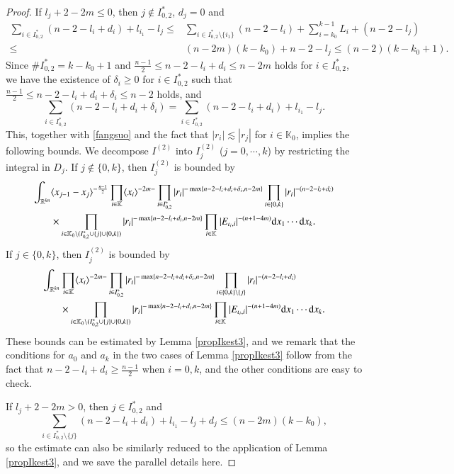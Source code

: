 \documentclass[11pt,reqno]{amsart}
\def\d{{\rm d}}
\numberwithin{equation}{section}
\theoremstyle{definition}
\begin{document}
\begin{proof}
	If $l_j+2-2m\leq0$, then $j\notin I_{0,2}^*$, $d_j=0$ and
	\begin{equation*}
		\begin{split}
			\sum_{i\in I_{0,2}^*}(n-2-l_i+d_i)+l_{i_1}-l_j\leq&\sum_{i\in I_{0,2}^*\setminus\{i_1\}}(n-2-l_i)+\sum_{i=k_0}^{k-1}L_i+(n-2-l_j)\\
			\leq&(n-2m)(k-k_0)+n-2-l_j\leq(n-2)(k-k_0+1).
		\end{split}
	\end{equation*}
	Since $\# I_{0,2}^*=k-k_0+1$ and $\frac{n-1}{2}\leq n-2-l_i+d_i\leq n-2m$ holds for $i\in I_{0,2}^*$, we have the existence of $\delta_i\geq0$ for $i\in I_{0,2}^*$ such that $\frac{n-1}{2}\leq n-2-l_i+d_i+\delta_i\leq n-2$ holds, and
	\begin{equation*}
		\sum_{i\in I_{0,2}^*}(n-2-l_i+d_i+\delta_i)=\sum_{i\in I_{0,2}^*}(n-2-l_i+d_i)+l_{i_1}-l_j.
	\end{equation*}
	This, together with \eqref{fangsuo} and the fact that $|r_i|\lesssim|r_j|$ for $i\in\mathbb{K}_0$, implies the following bounds. We decompose $I^{(2)}$ into $I^{(2)}_j$ ($j=0,\cdots,k$) by restricting the integral in $D_j$. If $j\notin\{0,k\}$, then $I^{(2)}_j$ is bounded by
	\begin{equation*}
		\begin{split}
			\int_{\mathbb{R}^{kn}}&\langle x_{j-1}-x_j\rangle^{-\frac{n-1}{2}}\prod_{i\in\mathbb{K}}\langle x_i\rangle^{-2m-}\prod_{i\in I_{0,2}^*}|r_i|^{-\max\{n-2-l_i+d_i+\delta_i,n-2m\}}\prod_{i\in\{0,k\}}|r_i|^{-(n-2-l_i+d_i)}\\
			&\times\prod_{i\in\mathbb{K}_0\setminus(I_{0,2}^*\cup\{j\}\cup\{0,k\})}|r_i|^{-\max\{n-2-l_i+d_i,n-2m\}}\prod_{i\in\mathbb{K}}|E_{\iota_i,i}|^{-(n+1-4m)}\d x_1\cdots\d x_k.
		\end{split}
	\end{equation*}
	If $j\in\{0,k\}$, then $I^{(2)}_j$ is bounded by
	\begin{equation*}
		\begin{split}
			\int_{\mathbb{R}^{kn}}&\prod_{i\in\mathbb{K}}\langle x_i\rangle^{-2m-}\prod_{i\in I_{0,2}^*}|r_i|^{-\max\{n-2-l_i+d_i+\delta_i,n-2m\}}\prod_{i\in\{0,k\}\setminus\{j\}}|r_i|^{-(n-2-l_i+d_i)}\\
			&\times\prod_{i\in\mathbb{K}_0\setminus(I_{0,2}^*\cup\{j\}\cup\{0,k\})}|r_i|^{-\max\{n-2-l_i+d_i,n-2m\}}\prod_{i\in\mathbb{K}}|E_{\iota_i,i}|^{-(n+1-4m)}\d x_1\cdots\d x_k.
		\end{split}
	\end{equation*}
	These bounds can be estimated by Lemma \ref{propIkest3}, and we remark that the conditions for $a_0$ and $a_k$ in the two cases of Lemma \ref{propIkest3} follow from the fact that $n-2-l_i+d_i\geq \frac{n-1}{2}$ when $i=0,k$, and the other conditions are easy to check.
	
	If $l_j+2-2m>0$, then $j\in I_{0,2}^*$ and
	\begin{equation*}
		\sum_{i\in I_{0,2}^*\setminus\{j\}}(n-2-l_i+d_i)+l_{i_1}-l_j+d_{j}\leq(n-2m)(k-k_0),
	\end{equation*}
	so the estimate can also be similarly reduced to the application of Lemma \ref{propIkest3}, and we save the parallel details here.
\end{proof}
\end{document}
